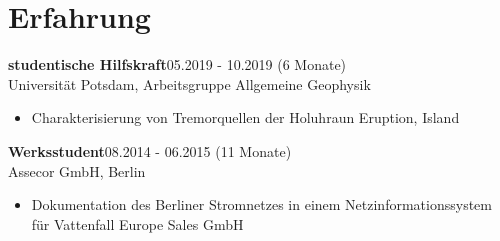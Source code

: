 \documentclass{article}
\newcommand{\spacingWork}{0.25cm}
\begin{document}
\begin{minipage}{0.71\textwidth}
	\section*{\fontsize{18pt}{24pt}\selectfont \color{pblue} Erfahrung}
		\textbf{studentische Hilfskraft}\hfill 05.2019  - 10.2019 (6 Monate)\\Universität Potsdam, Arbeitsgruppe Allgemeine Geophysik
		\begin{itemize}
			\item Charakterisierung von Tremorquellen der Holuhraun Eruption, Island
		\end{itemize}
	
	\vspace{\spacingWork}
	


		\textbf{Werksstudent}\hfill 08.2014 - 06.2015 (11 Monate)\\ Assecor GmbH, Berlin
		\begin{itemize}
			\item Dokumentation des Berliner Stromnetzes in einem Netzinformationssystem für Vattenfall Europe Sales GmbH
		\end{itemize}
		

\end{minipage}
\end{document}
